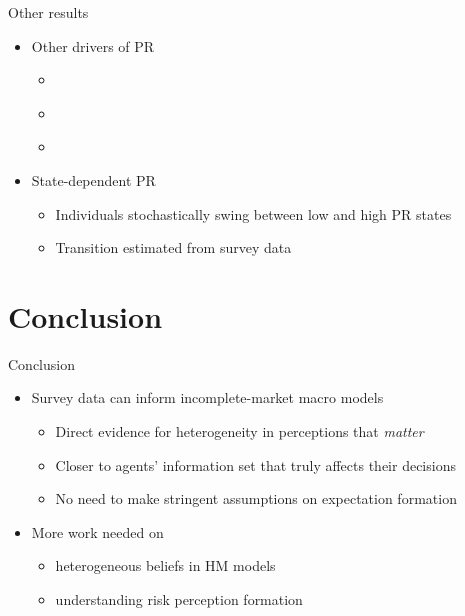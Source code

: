 \documentclass{beamer}
\begin{document}
\begin{frame}{Other results}
	\label{otherresults}
	
	\begin{itemize}
		\item Other drivers of PR
		\begin{itemize}
			\item \hyperlink{appendix:PR_macro_labor_market_correlation}{}
			\item \hyperlink{appendix:extrapolation}{}
			\item \hyperlink{appendix:experience}{}
		\end{itemize}
\item State-dependent PR 
\begin{itemize}
	\item Individuals stochastically swing between low and high PR states
	\item Transition estimated from survey data  \hyperlink{RegimeEstimation}{}
\end{itemize}

\end{itemize}
\end{frame}


\section{Conclusion}


\begin{frame}{Conclusion}
	
	\begin{itemize}
 	\item Survey data can inform incomplete-market macro models 
 	\begin{itemize}
 		\item Direct evidence for heterogeneity in perceptions that \textit{matter}
 		\item Closer to agents' information set that truly affects their decisions
 			\item No need to make stringent assumptions on expectation formation
 	\end{itemize}

	\item More work needed on 
	\begin{itemize}
		\item heterogeneous beliefs in HM models
		\item understanding risk perception formation  
	\end{itemize}
	\end{itemize}
\end{frame}
\end{document}
